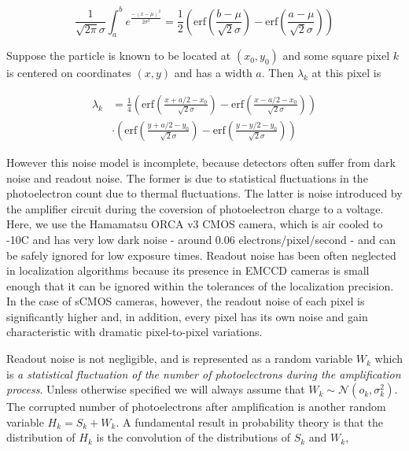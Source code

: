 \documentclass{ucetd}
\begin{document}
\begin{equation*}
\frac{1}{\sqrt{2\pi}\sigma}\int_{a}^{b} e^{\frac{-(x-\mu)^{2}}{2\sigma^{2}}} = \frac{1}{2}\left(\mathrm{erf}\left(\frac{b-\mu}{\sqrt{2}\sigma}\right) -\mathrm{erf}\left(\frac{a-\mu}{\sqrt{2}\sigma}\right)\right)
\end{equation*}

Suppose the particle is known to be located at $(x_{0},y_{0})$ and some square pixel $k$ is centered on coordinates $(x,y)$ and has a width $a$. Then $\lambda_{k}$ at this pixel is

\begin{align*}
\lambda_{k} &= \frac{1}{4}\left(\mathrm{erf}\left(\frac{x+a/2-x_{0}}{\sqrt{2}\sigma}\right) -\mathrm{erf}\left(\frac{x-a/2-x_{0}}{\sqrt{2}\sigma}\right)\right)\\
&\cdot \left(\mathrm{erf}\left(\frac{y+a/2-y_{0}}{\sqrt{2}\sigma}\right) -\mathrm{erf}\left(\frac{y-y/2-y_{0}}{\sqrt{2}\sigma}\right)\right)
\end{align*}

However this noise model is incomplete, because detectors often suffer from dark noise and readout noise. The former is due to statistical fluctuations in the photoelectron count due to thermal fluctuations. The latter is noise introduced by the amplifier circuit during the coversion of photoelectron charge to a voltage. Here, we use the Hamamatsu ORCA v3 CMOS camera, which is air cooled to -10C and has very low dark noise - around 0.06 electrons/pixel/second - and can be safely ignored for low exposure times. Readout noise has been often neglected in localization algorithms because its presence in EMCCD cameras is small enough that it can be ignored within the tolerances of the localization precision. In the case of sCMOS cameras, however, the readout noise of each pixel is significantly higher and, in addition, every pixel has its own noise and gain characteristic with dramatic pixel-to-pixel variations.

Readout noise is not negligible, and is represented as a random variable $W_{k}$ which is \textit{a statistical fluctuation of the number of photoelectrons during the amplification process}. Unless otherwise specified we will always assume that $W_{k} \sim \mathcal{N}(o_{k},\sigma_{k}^{2})$. The corrupted number of photoelectrons after amplification is another random variable $H_{k} = S_{k} + W_{k}$. A fundamental result in probability theory is that the distribution of $H_{k}$ is the convolution of the distributions of $S_{k}$ and $W_{k}$,
\end{document}
